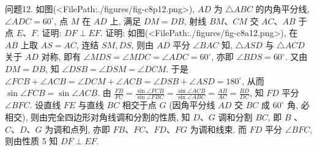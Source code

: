 问题12. 如图(<FilePath:./figures/fig-c8p12.png>), $A D$ 为 $\triangle A B C$ 的内角平分线, $\angle A D C=60^{\circ}$, 点 $M$ 在 $A D$ 上, 满足 $D M=D B$, 射线 $B M 、 C M$ 交 $A C 、 A B$ 于点 $E 、 F$. 证明: $D F \perp E F$.
证明: 如图(<FilePath:./figures/fig-c8a12.png>), 在 $A B$ 上取 $A S=A C$, 连结 $S M, D S$, 则由 $A D$ 平分 $\angle B A C$ 知, $\triangle A S D$ 与 $\triangle A C D$ 关于 $A D$ 对称, 即有 $\angle M D S= \angle M D C=\angle A D C=60^{\circ}$, 亦即 $\angle B D S=60^{\circ}$. 又由 $D M=D B$, 知 $\angle D S B=\angle D S M=\angle D C M$. 于是 $\angle F C B+\angle A C B=\angle D C M+\angle A C B=\angle D S B+\angle A S D= 180^{\circ}$, 从而 $\sin \angle F C B=\sin \angle A C B$.
由 $\frac{F B}{F C}=\frac{\sin \angle F C B}{\sin \angle F B C}=\frac{\sin \angle A C B}{\sin \angle A B C}=\frac{A B}{A C}=\frac{B D}{D C}$, 知 $F D$ 平分 $\angle B F C$.
设直线 $F E$ 与直线 $B C$ 相交于点 $G$ (因角平分线 $A D$ 交 $B C$ 成 $60^{\circ}$ 角, 必相交), 则由完全四边形对角线调和分割的性质, 知 $D 、 G$ 调和分割 $B C$, 即 $B$ 、 $C 、 D 、 G$ 为调和点列, 亦即 $F B 、 F C 、 F D 、 F G$ 为调和线束.
而 $F D$ 平分 $\angle B F C$, 则由性质 5 知 $D F \perp E F$.


